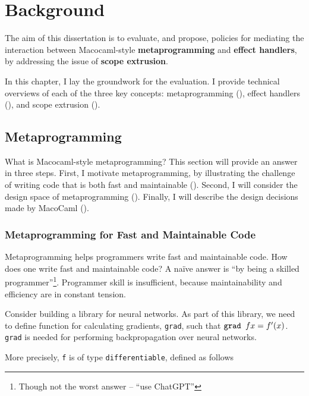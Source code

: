 \chapter{Background}
The aim of this dissertation is to evaluate, and propose, policies for mediating the interaction between Macocaml-style \textbf{metaprogramming} and \textbf{effect handlers}, by addressing the issue of \textbf{scope extrusion}.

In this chapter, I lay the groundwork for the evaluation. I provide technical overviews of each of the three key concepts: metaprogramming (), effect handlers (), and scope extrusion ().

\section{Metaprogramming}\label{section:metaprogramming-technical}
What is Macocaml-style metaprogramming? This section will provide an answer in three steps. First, I motivate metaprogramming, by illustrating the challenge of writing code that is both fast and maintainable (). Second, I will consider the design space of metaprogramming (). Finally, I will describe the design decisions made by MacoCaml ().

\subsection{Metaprogramming for Fast and Maintainable Code}\label{subsection:metaprogramming-motivation}

Metaprogramming helps programmers write fast and maintainable code. How does one write fast and maintainable code? A naïve answer is ``by being a skilled programmer''\footnote{Though not the worst answer -- ``use ChatGPT''}. Programmer skill is insufficient, because maintainability and efficiency are in constant tension. 

Consider building a library for neural networks. As part of this library, we need to define function for calculating gradients, \texttt{grad}, such that $\text{\texttt{grad }}f x = f'(x)$. \texttt{grad} is needed for performing backpropagation over neural networks.

More precisely, \texttt{f} is of type \texttt{differentiable}, defined as follows


